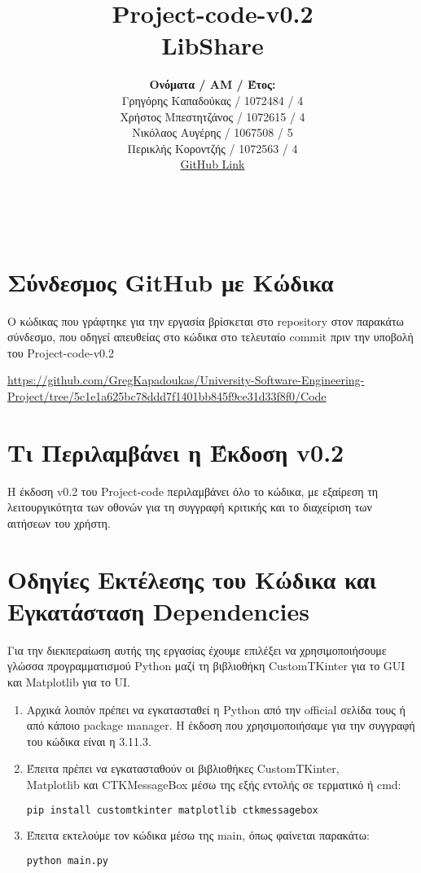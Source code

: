 \documentclass[12pt,a4paper]{article}
\title{Project-code-v0.2 \\ LibShare}
\author{\textbf{Ονόματα / ΑΜ / Έτος:} \\ Γρηγόρης Καπαδούκας / 1072484 / 4\textdegree \\ Χρήστος Μπεστητζάνος / 1072615 / 4\textdegree \\ Νικόλαος Αυγέρης / 1067508 / 5\textdegree \\ Περικλής Κοροντζής / 1072563 / 4\textdegree\\ \href{https://github.com/GregKapadoukas/University-Software-Engineering-Project}{\color{blue}GitHub Link}}
\begin{document}
\makeatletter
\begin{center}
	\LARGE{\@title} \\
	\pagebreak
    \begin{LARGE}\@author\end{LARGE}
    \pagebreak
\end{center}

\section{Σύνδεσμος GitHub με Κώδικα}
Ο κώδικας που γράφτηκε για την εργασία βρίσκεται στο repository στον παρακάτω σύνδεσμο, που οδηγεί απευθείας στο κώδικα στο τελευταίο commit πριν την υποβολή του Project-code-v0.2

\textcolor{blue}{\href{https://github.com/GregKapadoukas/University-Software-Engineering-Project/tree/5c1e1a625bc78ddd7f1401bb845f9ce31d33f8f0/Code}{https://github.com/GregKapadoukas/University-Software-Engineering-Project/tree/5c1e1a625bc78ddd7f1401bb845f9ce31d33f8f0/Code}}

\section{Τι Περιλαμβάνει η Έκδοση v0.2}

Η έκδοση v0.2 του Project-code περιλαμβάνει όλο το κώδικα, με εξαίρεση τη λειτουργικότητα των οθονών για τη συγγραφή κριτικής και το διαχείριση των αιτήσεων του χρήστη.

\section{Οδηγίες Εκτέλεσης του Κώδικα και Εγκατάσταση Dependencies}
Για την διεκπεραίωση αυτής της εργασίας έχουμε επιλέξει να χρησιμοποιήσουμε γλώσσα προγραμματισμού Python μαζί τη βιβλιοθήκη CustomTKinter για το GUI και Matplotlib για το UI.

\begin{enumerate}
    \item Αρχικά λοιπόν πρέπει να εγκατασταθεί η Python από την official σελίδα τους ή από κάποιο package manager. Η έκδοση που χρησιμοποιήσαμε για την συγγραφή του κώδικα είναι η 3.11.3.

    \item Έπειτα πρέπει να εγκατασταθούν οι βιβλιοθήκες CustomTKinter,\\Matplotlib και CTKMessageBox μέσω της εξής εντολής σε τερματικό ή cmd:

\begin{lstlisting}[language=Bash]
pip install customtkinter matplotlib ctkmessagebox\end{lstlisting}

    \item Έπειτα εκτελούμε τον κώδικα μέσω της main, όπως φαίνεται παρακάτω:

\begin{lstlisting}[language=Bash]
python main.py\end{lstlisting}
\end{enumerate}
\end{document}
